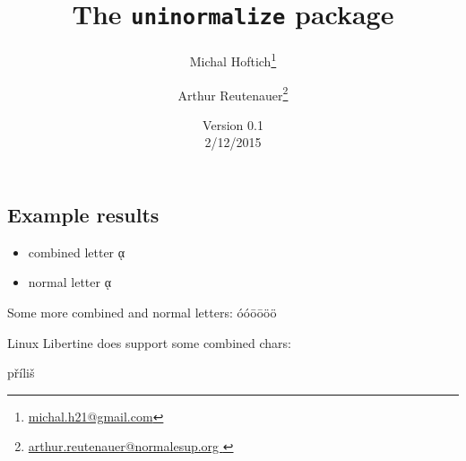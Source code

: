 \documentclass{article}
\begin{document}
\title{The \texttt{uninormalize} package}
\author{Michal Hoftich\footnote{\url{michal.h21@gmail.com}} \and Arthur Reutenauer\footnote{\url{arthur.reutenauer@normalesup.org }}}
\date{Version 0.1\\2/12/2015}
\maketitle


\subsection{Example results}

\begin{itemize}
  \item combined letter ᾳ %
  \item normal letter ᾳ%
\end{itemize}

Some more combined and normal letters: 
óóōōöö

Linux Libertine does support some combined chars: \parbox{4em}{příliš}
\end{document}
